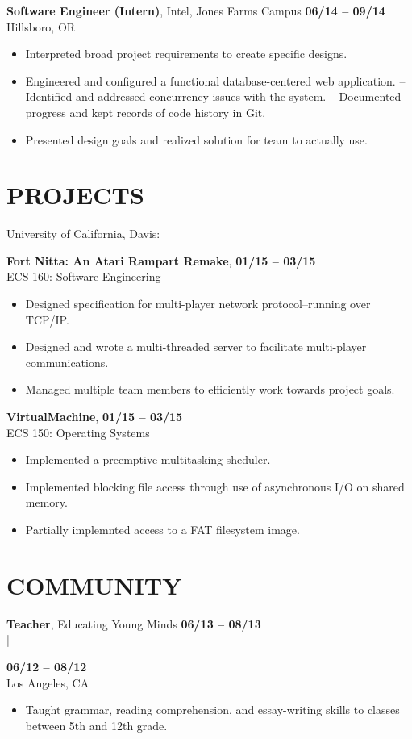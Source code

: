 \documentclass[line, letterpaper, 10pt]{res}
\begin{document}
\begin{resume}
    {\bf Software Engineer (Intern)}, Intel, Jones Farms Campus \hfill {\bf 06/14 -- 09/14} \\
    Hillsboro, OR
    \begin{itemize} \itemsep -2pt
        \item Interpreted broad project requirements to create specific designs.
        \item Engineered and configured a functional database-centered web application.
            \subitem -- Identified and addressed concurrency issues with the system.
            \subitem -- Documented progress and kept records of code history in Git.
        \item Presented design goals and realized solution for team to actually use.
    \end{itemize}

\section{PROJECTS}

    University of California, Davis:

    {\bf Fort Nitta: An Atari Rampart Remake}, \hfill {\bf 01/15 -- 03/15} \\
    ECS 160: Software Engineering
    \begin{itemize} \itemsep -2pt
        \item Designed specification for multi-player network protocol--running over TCP/IP.
        \item Designed and wrote a multi-threaded server to facilitate multi-player communications.
        \item Managed multiple team members to efficiently work towards project goals.
    \end{itemize}

    {\bf VirtualMachine}, \hfill  {\bf 01/15 -- 03/15} \\
    ECS 150: Operating Systems
    \begin{itemize} \itemsep -2pt
        \item Implemented a preemptive multitasking sheduler.
        \item Implemented blocking file access through use of asynchronous I/O on shared memory.
        \item Partially implemnted access to a FAT filesystem image.
    \end{itemize}

\section{COMMUNITY}
    {\bf Teacher}, Educating Young Minds \hfill {\bf 06/13 -- 08/13} \\
    |\raggedright{\hfill {\bf 06/12 -- 08/12}} \\
    Los Angeles, CA
    \begin{itemize} \itemsep -2pt
        \item Taught grammar, reading comprehension, and essay-writing skills to classes between 5th and 12th grade.
    \end{itemize}


\end{resume}
\end{document}
